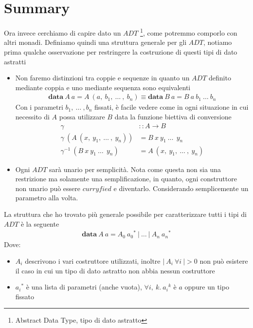 \section{Summary}
\label{summary}

Ora invece cerchiamo di capire dato un $ADT$
\footnote{Abstract Data Type, tipo di dato astratto}, come potremmo comporlo con
altri monadi.
Definiamo quindi una struttura generale per gli $ADT$, notiamo prima qualche
osservazione per restringere la costruzione di questi tipi di dato astratti
\begin{itemize}
  \item Non faremo distinzioni tra coppie e sequenze in quanto un $ADT$ definito
    mediante coppia e uno mediante sequenza sono equivalenti
    \begin{align*}
      \bm{data}\ A\ a = A\ (a,\ b_1,\ \dots\ ,\ b_n) \equiv \bm{data}\ B\ a = B\ a\ b_1\ \dots\ b_n
    \end{align*}
    Con i parametri $b_1,\ \dots\ ,b_n$ fissati, è facile vedere come in ogni situazione
    in cui necessito di $A$ possa utilizzare $B$ data la funzione biettiva di conversione
    \begin{align*}
      \gamma &:: A \to B\\
      \gamma\ (A\ (x,\ y_1,\ \dots\ ,\ y_n)) &= B\ x\ y_1\ \dots\ \ y_n\\
      \gamma^{-1}\ (B\ x\ y_1\ \dots\ \ y_n) &= A\ (x,\ y_1,\ \dots\ ,\ y_n)
    \end{align*}
  \item Ogni $ADT$ sarà unario per semplicità. Nota come questa non sia una restrizione
    ma solamente una semplificazione, in quanto, ogni construttore non unario
    può essere $curryfied$ e diventarlo.
    Considerando semplicemente un parametro alla volta.
\end{itemize}
La struttura che ho trovato più generale possibile per caratterizzare tutti i tipi
di $ADT$ è la seguente
\begin{align*}
  \bm{data}\ A\ a = A_0\ a{_0}{^*}\ |\ \dots\ |\ A_n\ a{_n}{^*}
\end{align*}
Dove:
\begin{itemize}
  \item $A_i$ descrivono i vari costruttore utilizzati, inoltre $|\ A_i\ \forall i\ | >0$
    non può esistere il caso in cui un tipo di dato astratto non abbia nessun costruttore
  \item $a{_i}{^*}$ è una lista di parametri (anche vuota), $\forall i,\ k.\ a{_i}{^k}$ è $a$ oppure un tipo fissato
\end{itemize}
